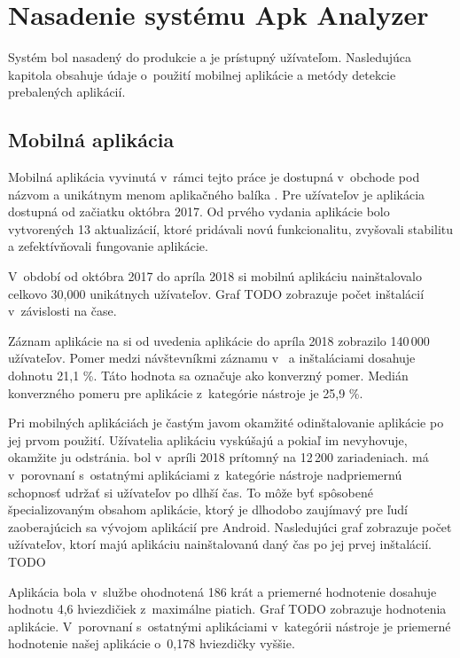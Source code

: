 \chapter{Nasadenie systému Apk Analyzer}
Systém  bol nasadený do produkcie a je prístupný užívateľom. Nasledujúca kapitola obsahuje údaje o~použití mobilnej aplikácie a metódy detekcie prebalených aplikácií.

\section{Mobilná aplikácia}

Mobilná aplikácia vyvinutá v~rámci tejto práce je dostupná v~obchode  pod názvom  a unikátnym menom aplikačného balíka . Pre užívateľov je aplikácia dostupná od začiatku októbra 2017. Od prvého vydania aplikácie bolo vytvorených 13 aktualizácií, ktoré pridávali novú funkcionalitu, zvyšovali stabilitu a zefektívňovali fungovanie aplikácie.

V~období od októbra 2017 do apríla 2018 si mobilnú aplikáciu nainštalovalo celkovo 30,000 unikátnych užívateľov. Graf TODO zobrazuje počet inštalácií v~závislosti na čase. 

Záznam aplikácie na  si od uvedenia aplikácie do apríla 2018 zobrazilo 140\,000 užívateľov. Pomer medzi návštevníkmi záznamu v~ a inštaláciami dosahuje dohnotu 21,1 \%. Táto hodnota sa označuje ako konverzný pomer. Medián konverzného pomeru pre aplikácie z~kategórie nástroje je 25,9 \%. 

Pri mobilných aplikáciách je častým javom okamžité odinštalovanie aplikácie po jej prvom použití. Užívatelia aplikáciu vyskúšajú a pokiaľ im nevyhovuje, okamžite ju odstránia.  bol v~apríli 2018 prítomný na 12\,200 zariadeniach.  má v~porovnaní s~ostatnými aplikáciami z~kategórie nástroje nadpriemernú schopnosť udržať si užívateľov po dlhší čas. To môže byť spôsobené špecializovaným obsahom aplikácie, ktorý je dlhodobo zaujímavý pre ľudí zaoberajúcich sa vývojom aplikácií pre Android. Nasledujúci graf zobrazuje počet užívateľov, ktorí majú aplikáciu nainštalovanú daný čas po jej prvej inštalácií. TODO

Aplikácia bola v~službe  ohodnotená 186 krát a priemerné hodnotenie dosahuje hodnotu 4,6 hviezdičiek z~maximálne piatich. Graf TODO zobrazuje hodnotenia aplikácie. V~porovnaní s~ostatnými aplikáciami v~kategórii nástroje je priemerné hodnotenie našej aplikácie o~0,178 hviezdičky vyššie.


